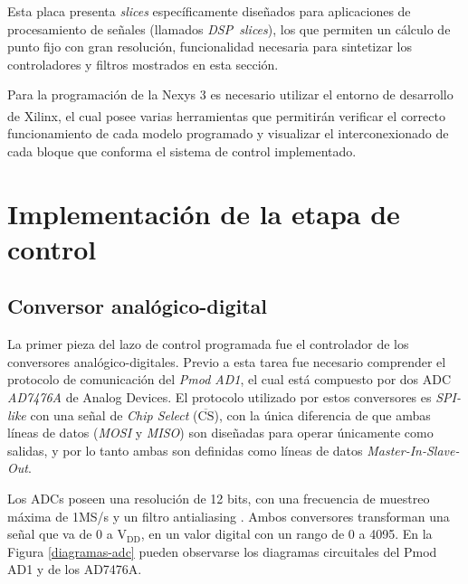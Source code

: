 Esta placa presenta \emph{slices} específicamente diseñados para aplicaciones de procesamiento de señales (llamados \mbox{\emph{DSP slices}}), los que permiten un cálculo de punto fijo con gran resolución, funcionalidad necesaria para sintetizar los controladores y filtros mostrados en esta sección.

Para la programación de la Nexys 3 es necesario utilizar el entorno de desarrollo de Xilinx\textsuperscript\textregistered \hspace{0.6pt}, el cual posee varias herramientas que permitirán verificar el correcto funcionamiento de cada modelo programado y visualizar el interconexionado de cada bloque que conforma el sistema de control implementado. 

\section{Implementación de la etapa de control}

\subsection{Conversor analógico-digital}

La primer pieza del lazo de control programada fue el controlador de los conversores analógico-digitales. Previo a esta tarea fue necesario comprender el protocolo de comunicación del \emph{Pmod AD1}, el cual está compuesto por dos ADC \emph{AD7476A} de Analog Devices. El protocolo utilizado por estos conversores es \emph{SPI-like} con una señal de \emph{Chip Select} ($\overline{\mbox{CS}}$), con la única diferencia de que ambas líneas de datos (\emph{MOSI} y \emph{MISO}) son diseñadas para operar únicamente como salidas, y por lo tanto ambas son definidas como líneas de datos \emph{Master-In-Slave-Out}.

Los ADCs poseen una resolución de 12 bits, con una frecuencia de muestreo máxima de 1MS/s y un filtro antialiasing \cite{ad7476a}. Ambos conversores transforman una señal que va de 0 a $\mathrm{V_{DD}}$, en un valor digital con un rango de 0 a 4095. En la Figura \ref{diagramas-adc} pueden observarse los diagramas circuitales del Pmod AD1 y de los AD7476A.

